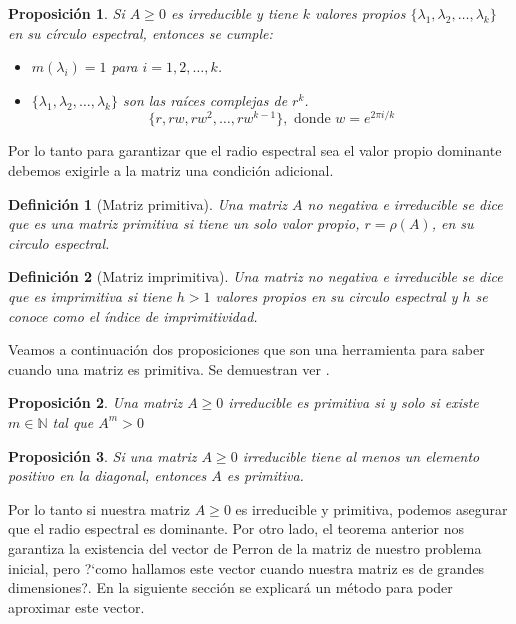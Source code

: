 \documentclass[size=a4, parskip=half, titlepage=false, toc=flat, toc=bib, 12pt, twoside]{scrartcl}
\theoremstyle{theorem-style}
\newtheorem{nprop}{Proposición}[section]
\theoremstyle{definition-style}
\newtheorem{ndef}{Definición}[section]
\theoremstyle{remark-style}
\theoremstyle{example-style}
\theoremstyle{definition-style}
\theoremstyle{remark-style}
\begin{document}
\begin{nprop}
Si $A \geq 0$ es irreducible y tiene $k$ valores propios $\{ \lambda_1, \lambda_2, \dots, \lambda_k \}$ en su círculo espectral, entonces se cumple:
\begin{itemize}
\item $m(\lambda_i)=1$ para $i = 1,2, \dots , k$.
\item $\{ \lambda_1, \lambda_2, \dots, \lambda_k \}$ son las raíces complejas de $r^k$.
$$\{r , rw, rw^2, \dots, r w^{k-1} \}, \textrm{ donde } w = e^{2 \pi i /k} $$
\end{itemize}
\end{nprop}


Por lo tanto para garantizar que el radio espectral sea el valor propio dominante debemos exigirle a la matriz una condición adicional.

\begin{ndef}[Matriz primitiva]
Una matriz $A$ no negativa e irreducible se dice que es una matriz primitiva si tiene un solo valor propio, $r = \rho(A)$, en su circulo espectral.
\end{ndef}

\begin{ndef}[Matriz imprimitiva]
Una matriz no negativa e irreducible se dice que es imprimitiva si tiene $h > 1$ valores propios en su circulo espectral y $h$ se conoce como el índice de imprimitividad.
\end{ndef}

Veamos a continuación dos proposiciones que son una herramienta para saber cuando una matriz es primitiva. Se demuestran ver \cite{algebralineal}.

\begin{nprop}
Una matriz $A \geq  0$ irreducible es primitiva si y solo si existe $m \in \mathbb{N}$ tal que $A^m >0$
\end{nprop}

\begin{nprop}
Si una matriz $A \geq 0$ irreducible tiene al menos un elemento positivo en la diagonal, entonces $A$ es primitiva.
\end{nprop}

Por lo tanto si nuestra matriz $A \geq 0$ es irreducible y primitiva, podemos asegurar que el radio espectral es dominante. Por otro lado, el teorema anterior nos garantiza la existencia del vector de Perron de la matriz de nuestro problema inicial, pero ?`como hallamos este vector cuando nuestra matriz es de grandes dimensiones?. En la siguiente sección se explicará un método para poder aproximar este vector.
\end{document}
